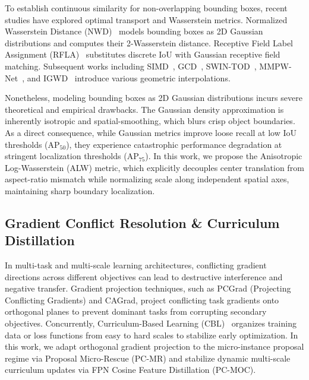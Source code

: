 To establish continuous similarity for non-overlapping bounding boxes, recent studies have explored optimal transport and Wasserstein metrics. Normalized Wasserstein Distance (NWD)~\cite{xu2022nwd} models bounding boxes as 2D Gaussian distributions and computes their 2-Wasserstein distance. Receptive Field Label Assignment (RFLA)~\cite{xu2022rfla} substitutes discrete IoU with Gaussian receptive field matching. Subsequent works including SIMD~\cite{shi2024simd}, GCD~\cite{guan2025gcd}, SWIN-TOD~\cite{wang2024swintod}, MMPW-Net~\cite{su2024mmpw}, and IGWD~\cite{hu2026igwd} introduce various geometric interpolations. 

Nonetheless, modeling bounding boxes as 2D Gaussian distributions incurs severe theoretical and empirical drawbacks. The Gaussian density approximation is inherently isotropic and spatial-smoothing, which blurs crisp object boundaries. As a direct consequence, while Gaussian metrics improve loose recall at low IoU thresholds ($\text{AP}_{50}$), they experience catastrophic performance degradation at stringent localization thresholds ($\text{AP}_{75}$). In this work, we propose the Anisotropic Log-Wasserstein (ALW) metric, which explicitly decouples center translation from aspect-ratio mismatch while normalizing scale along independent spatial axes, maintaining sharp boundary localization.

\subsection{Gradient Conflict Resolution \& Curriculum Distillation}
In multi-task and multi-scale learning architectures, conflicting gradient directions across different objectives can lead to destructive interference and negative transfer. Gradient projection techniques, such as PCGrad (Projecting Conflicting Gradients) and CAGrad, project conflicting task gradients onto orthogonal planes to prevent dominant tasks from corrupting secondary objectives. Concurrently, Curriculum-Based Learning (CBL)~\cite{chen2024dila} organizes training data or loss functions from easy to hard scales to stabilize early optimization. In this work, we adapt orthogonal gradient projection to the micro-instance proposal regime via Proposal Micro-Rescue (PC-MR) and stabilize dynamic multi-scale curriculum updates via FPN Cosine Feature Distillation (PC-MOC).
